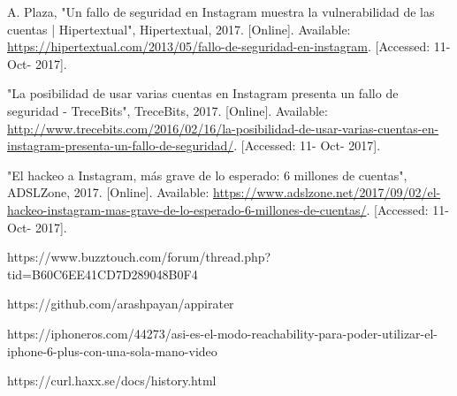 \documentclass[a4paper,11pt]{article}
\theoremstyle{mytheor}
\begin{document}
\newpage










\begin{thebibliography}{1}
A. Plaza, "Un fallo de seguridad en Instagram muestra la vulnerabilidad de las cuentas | Hipertextual", Hipertextual, 2017. [Online]. Available: \url{https://hipertextual.com/2013/05/fallo-de-seguridad-en-instagram}. [Accessed: 11- Oct- 2017].


"La posibilidad de usar varias cuentas en Instagram presenta un fallo de seguridad - TreceBits", TreceBits, 2017. [Online]. Available: \url{http://www.trecebits.com/2016/02/16/la-posibilidad-de-usar-varias-cuentas-en-instagram-presenta-un-fallo-de-seguridad/}. [Accessed: 11- Oct- 2017].

"El hackeo a Instagram, más grave de lo esperado: 6 millones de cuentas", ADSLZone, 2017. [Online]. Available: \url{https://www.adslzone.net/2017/09/02/el-hackeo-instagram-mas-grave-de-lo-esperado-6-millones-de-cuentas/}. [Accessed: 11- Oct- 2017].

https://www.buzztouch.com/forum/thread.php?tid=B60C6EE41CD7D289048B0F4

https://github.com/arashpayan/appirater

https://iphoneros.com/44273/asi-es-el-modo-reachability-para-poder-utilizar-el-iphone-6-plus-con-una-sola-mano-video

https://curl.haxx.se/docs/history.html

\end{thebibliography}

\newpage
\end{document}
